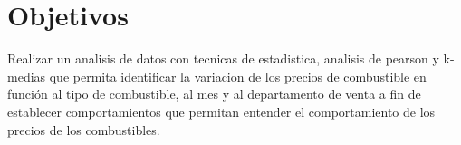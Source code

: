 \section{Objetivos}
 Realizar un analisis de datos con tecnicas de estadistica, analisis de pearson y k-medias que permita identificar la variacion de los precios de combustible en función al tipo de combustible, al mes y al departamento de venta a fin de establecer comportamientos que permitan entender el comportamiento de los precios de los combustibles.
